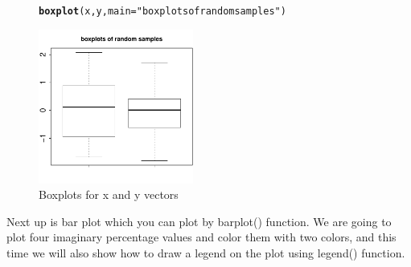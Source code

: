 \documentclass[english,nohyper]{tufte-book}\usepackage[]{graphicx}\usepackage[]{color}
\makeatletter
\newcommand{\hlstr}[1]{\textcolor[rgb]{0.192,0.494,0.8}{#1}}%
\newcommand{\hlstd}[1]{\textcolor[rgb]{0.345,0.345,0.345}{#1}}%
\newcommand{\hlkwc}[1]{\textcolor[rgb]{0.333,0.667,0.333}{#1}}%
\newcommand{\hlkwd}[1]{\textcolor[rgb]{0.737,0.353,0.396}{\textbf{#1}}}%
\newenvironment{kframe}{%
 \def\at@end@of@kframe{}%
 \ifinner\ifhmode%
  \def\at@end@of@kframe{\end{minipage}}%
  \begin{minipage}{\columnwidth}%
 \fi\fi%
 \def\FrameCommand##1{\hskip\@totalleftmargin \hskip-\fboxsep
 \colorbox{shadecolor}{##1}\hskip-\fboxsep
     \hskip-\linewidth \hskip-\@totalleftmargin \hskip\columnwidth}%
 \MakeFramed {\advance\hsize-\width
   \@totalleftmargin\z@ \linewidth\hsize
   \@setminipage}}%
 {\par\unskip\endMakeFramed%
 \at@end@of@kframe}
\newenvironment{knitrout}{}{} %
\makeatother
\begin{document}
\begin{figure}
\begin{knitrout}
\color{fgcolor}\begin{kframe}
\begin{alltt}
\hlkwd{boxplot}\hlstd{(x,y,}\hlkwc{main}\hlstd{=}\hlstr{"boxplots of random samples"}\hlstd{)}
\end{alltt}
\end{kframe}

{\centering \includegraphics[width=2in]{figure/graphics-boxplot} 

}



\end{knitrout}


\caption{Boxplots for x and y vectors}
\end{figure}


Next up is bar plot which you can plot by barplot() function. We are
going to plot four imaginary percentage values and color them with
two colors, and this time we will also show how to draw a legend on
the plot using legend() function.
\end{document}
